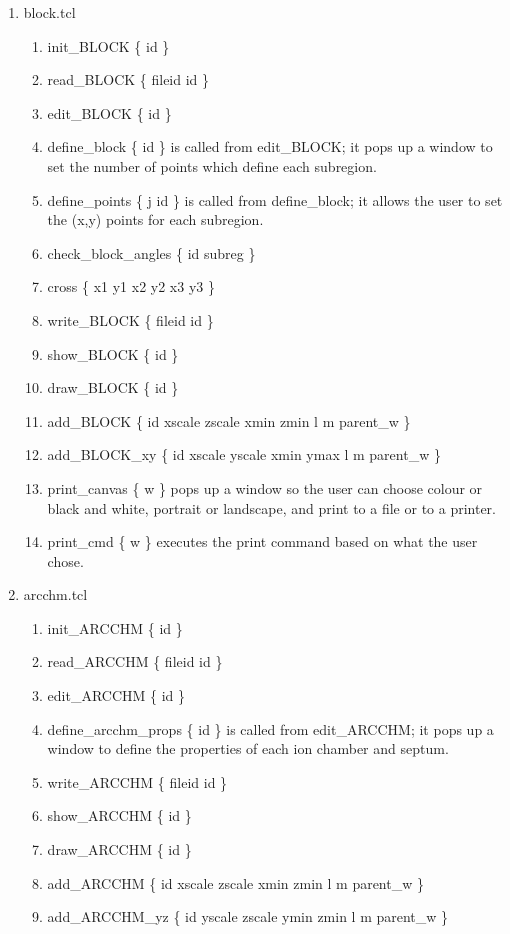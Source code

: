 \documentclass[12pt]{book}
\begin{document}
\begin{enumerate}
\item block.tcl
\begin{enumerate}
\item {\sf init\_BLOCK \{ id \}}
\item {\sf read\_BLOCK \{ fileid id \}}
\item {\sf edit\_BLOCK \{ id \}}
\item {\sf define\_block \{ id \}} is called from {\sf edit\_BLOCK}; it
pops up a window  to set the number of points which define each subregion.
\item {\sf define\_points \{ j id \}} is called from {\sf
define\_block}; it allows the user to set the (x,y) points for each subregion.
\item {\sf check\_block\_angles \{ id subreg \}}
\item {\sf cross \{ x1 y1 x2 y2 x3 y3 \}}
\item {\sf write\_BLOCK \{ fileid id \}}
\item {\sf show\_BLOCK \{ id \}}
\item {\sf draw\_BLOCK \{ id \}}
\item {\sf add\_BLOCK \{ id xscale zscale xmin zmin l m parent\_w \}}
\item {\sf add\_BLOCK\_xy \{ id xscale yscale xmin ymax l m parent\_w \}}
\item {\sf print\_canvas \{ w \}} pops up a window so the user can
choose colour or black and white, portrait or landscape, and print to a
file or to a printer.
\item {\sf print\_cmd \{ w \}} executes the print command based on what
the user chose.
\end{enumerate}

\item arcchm.tcl
\begin{enumerate}
\item {\sf init\_ARCCHM \{ id \}}
\item {\sf read\_ARCCHM \{ fileid id \}}
\item {\sf edit\_ARCCHM \{ id \}}
\item {\sf define\_arcchm\_props \{ id \}} is called from {\sf edit\_ARCCHM}; it
pops up a window  to define the properties of each ion chamber and septum.
\item {\sf write\_ARCCHM \{ fileid id \}}
\item {\sf show\_ARCCHM \{ id \}}
\item {\sf draw\_ARCCHM \{ id \}}
\item {\sf add\_ARCCHM \{ id xscale zscale xmin zmin l m parent\_w \}}
\item {\sf add\_ARCCHM\_yz \{ id yscale zscale ymin zmin l m parent\_w \}}
\end{enumerate}

\end{enumerate}
\end{document}
